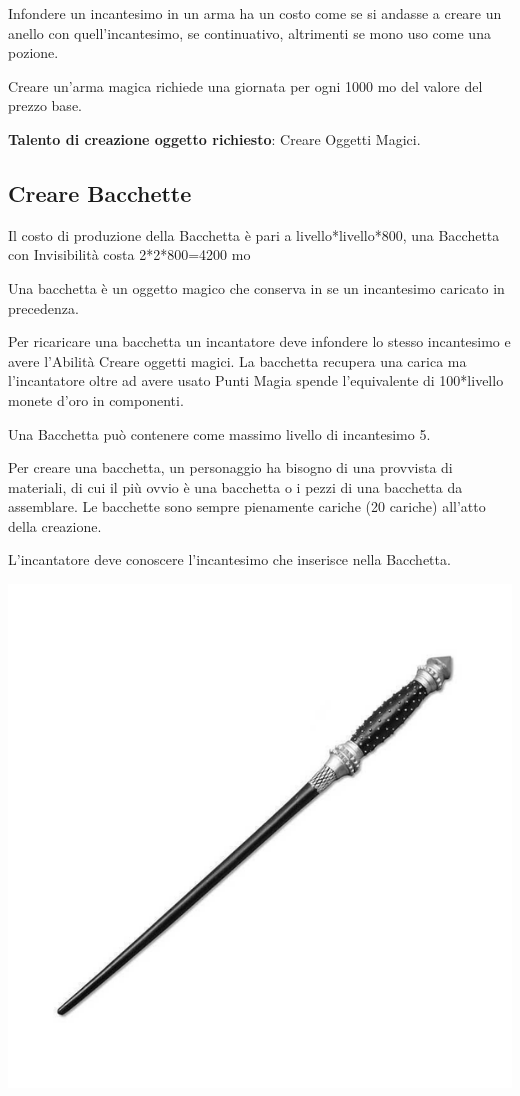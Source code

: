 \begin{multicols}{2}
Infondere un incantesimo in un arma ha un costo come se si andasse a creare un anello con quell'incantesimo, se continuativo, altrimenti se mono uso come una pozione.

Creare un'arma magica richiede una giornata per ogni 1000 mo del valore del prezzo base.

\medskip

\textbf{Talento di creazione oggetto richiesto}: Creare Oggetti Magici.

\subsection{Creare Bacchette}

Il costo di produzione della Bacchetta è pari a livello*livello*800, una Bacchetta con Invisibilità costa 2*2*800=4200 mo

Una bacchetta è un oggetto magico che conserva in se un incantesimo caricato in precedenza.

Per ricaricare una bacchetta un incantatore deve infondere lo stesso incantesimo e avere l'Abilità Creare oggetti magici. La bacchetta recupera una carica ma l'incantatore oltre ad avere usato Punti Magia spende l'equivalente di 100*livello monete d'oro in componenti.

Una Bacchetta può contenere come massimo livello di incantesimo 5.

Per creare una bacchetta, un personaggio ha bisogno di una provvista di materiali, di cui il più ovvio è una bacchetta o i pezzi di una bacchetta da assemblare. Le bacchette sono sempre pienamente cariche (20 cariche) all'atto della creazione.

L'incantatore deve conoscere l'incantesimo che inserisce nella Bacchetta.

\begin{center}
\includegraphics[width=0.5\linewidth]{immagini/wand.png}
\end{center}


\end{multicols}
